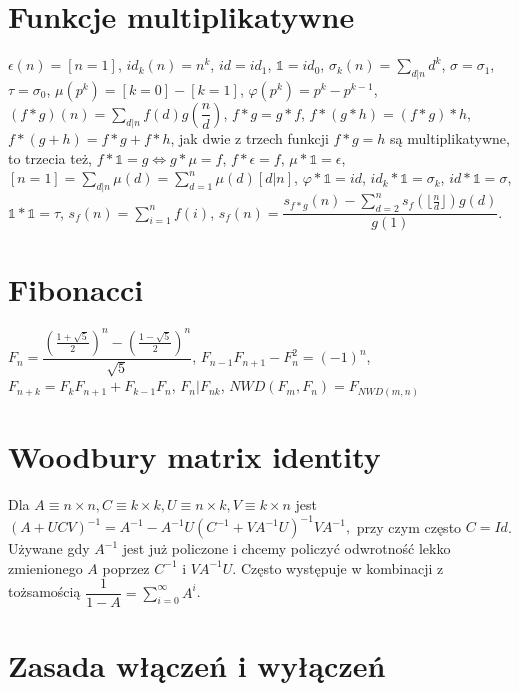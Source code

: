 \section{Funkcje multiplikatywne}
			$\epsilon\left(n\right) = [n = 1]$,
			$id_k\left(n\right) = n^k$, $id = id_1$, $\mathbb{1} = id_0$,
			$\sigma_k\left(n\right) = \sum_{d|n}d^k$, $\sigma = \sigma_1$, $\tau = \sigma_0$,
			$\mu\left(p^k\right) = [k = 0] - [k = 1]$,
			$\varphi\left(p^k\right) = p^k - p^{k - 1}$,
			$\left(f \ast g\right)\left(n\right) = \sum_{d|n}f\left(d\right)g\left(\dfrac{n}{d}\right)$,
			$f \ast g = g \ast f$,
			$f \ast \left(g \ast h\right) = \left(f \ast g\right) \ast h$,
			$f \ast \left(g + h\right) = f \ast g + f \ast h$,
			jak dwie z trzech funkcji $f \ast g = h$ są multiplikatywne, to trzecia też,
			$f \ast \mathbb{1} = g \Leftrightarrow g \ast \mu = f$,
			$f \ast \epsilon = f$,
			$\mu \ast \mathbb{1} = \epsilon$, $[n = 1] = \sum_{d|n}\mu\left(d\right) =\sum_{d=1}^n\mu\left(d\right)[d|n]$,
			$\varphi \ast \mathbb{1} = id$,
			$id_k \ast \mathbb{1} = \sigma_k$, $id \ast \mathbb{1} = \sigma$, $\mathbb{1} \ast \mathbb{1} = \tau$,
			$s_f\left(n\right) = \sum_{i=1}^nf\left(i\right)$,
			$s_f\left(n\right) = \dfrac{s_{f\ast g}\left(n\right) - \sum_{d=2}^n s_f\left(\lfloor\frac{n}{d}\rfloor\right)g\left(d\right)}{g\left(1\right)}$.

\section{Fibonacci}

$F_n = \dfrac{\left(\frac{1+\sqrt{5}}{2}\right)^n - \left(\frac{1-\sqrt{5}}{2}\right)^n}{\sqrt{5}}$,
$F_{n-1}F_{n+1}-F_n^2=(-1)^n$, $F_{n+k}=F_k F_{n+1} + F_{k-1} F_n$, $F_n | F_{nk}$, $NWD(F_m, F_n) = F_{NWD(m, n)}$

\section{Woodbury matrix identity}

Dla $A\equiv n\times n, C\equiv k\times k, U\equiv n\times k, V\equiv k\times n$
jest $(A+UCV)^{-1} = A^{-1} - A^{-1}U(C^{-1}+VA^{-1}U)^{-1}VA^{-1},$
przy czym często $C=Id$.
Używane gdy $A^{-1}$ jest już policzone i chcemy policzyć odwrotność lekko zmienionego $A$
poprzez $C^{-1}$ i $VA^{-1}U$.
Często występuje w kombinacji z tożsamością $\dfrac{1}{1-A} = \sum_{i=0}^\infty A^i$.

\section{Zasada włączeń i wyłączeń}

